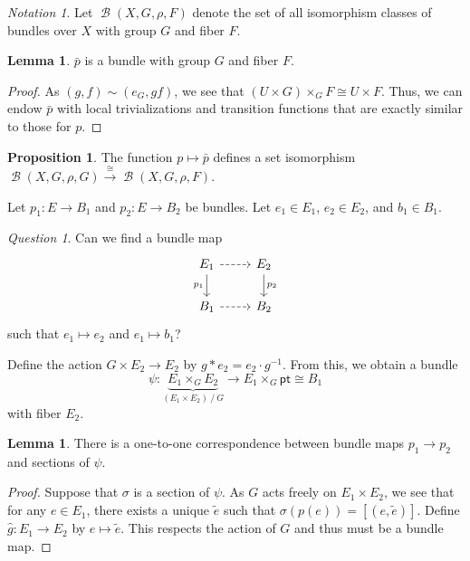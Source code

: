 \documentclass[10pt,letterpaper,cm]{nupset}
\theoremstyle{definition}
\theoremstyle{theorem}
\newtheorem{lemma}[defn]{Lemma}
\newtheorem{prop}[defn]{Proposition}
\theoremstyle{remark}
\newtheorem*{question}{Question}
\newtheorem*{notation}{Notation}
\newcommand{\1}{\mathbb{1}}
\newcommand{\0}{\vec 0}
\newcommand{\pt}{\mathsf{pt}}
\DeclareMathOperator{\B}{\mathcal{B}}
\begin{document}
\begin{notation}
Let $\B\left(X, G, \rho, F\right)$ denote the set of all isomorphism classes of bundles over $X$ with group $G$ and fiber $F$. 
\end{notation}

\begin{lemma}
$\bar{p}$ is a bundle with group $G$ and fiber $F$.
\end{lemma}
\begin{proof}
As $\left(g,f\right)\sim \left(e_G, gf\right)$, we see that $\left( U \times G\right) \times_G F\cong U\times F$. Thus, we can endow $\bar{p}$ with local trivializations and transition functions that are exactly similar to those for $p$.
\end{proof}

\begin{prop}\label{iso}
 The function $p\mapsto \bar{p}$ defines a set isomorphism $\B\left(X, G, \rho, G\right) \overset{\cong}{\longrightarrow} \B\left(X, G, \rho, F\right)$. 
\end{prop}

Let $p_1 : E \to B_1$ and $p_2 : E \to B_2$ be bundles. Let $e_1 \in E_1$, $e_2\in E_2$, and $b_1\in B_1$.

\begin{question}
Can we find a bundle map
\[
\begin{tikzcd}
E_1 \arrow[r, dashed] \arrow[d, "p_1"'] & E_2 \arrow[d, "p_2"] \\
B_1 \arrow[r, dashed]                   & B_2                 
\end{tikzcd}
\]
such that $e_1\mapsto e_2$ and $e_1\mapsto b_1$?
\end{question}

Define the action $G\times E_2 \to E_2$ by $g\ast e_2 = e_2\cdot g^{-1}$. From this, we obtain a bundle $$\psi: \underbrace{E_1 \times_G E_2}_{\left(E_1 \times E_2\right)\mathbin{/}{G}} \to E_1 \times_G \pt \cong B_1$$ with fiber $E_2$.

\begin{lemma}\label{corr}
There is a one-to-one correspondence between bundle maps $p_1\to p_2$ and sections of $\psi$.
\end{lemma}
\begin{proof}
Suppose that $\sigma$ is a section of $\psi$.  As $G$ acts freely on $E_1 \times E_2$, we see that for any $e\in E_1$, there exists a unique $\tilde{e}$ such that $\sigma\left(p(e)\right)=\left[\left(e, \tilde{e}\right)\right]$. Define $\hat{g} : E_1\to E_2$ by $e\mapsto \tilde{e}$. This respects the action of $G$ and thus must be a bundle map.
\end{proof}
\end{document}
